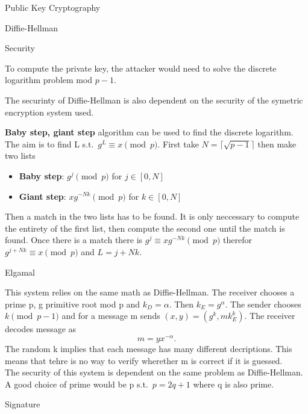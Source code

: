 \documentclass[12pt, letterpaper]{article}
\begin{document}
\begin{section}{Public Key Cryptography}
\begin{subsection}{Diffie-Hellman}
    \begin{subsubsection}{Security}

      To compute the private key, the attacker would need to solve the discrete
      logarithm problem mod \(p - 1\).

      The securinty of Diffie-Hellman is also dependent on the security of the
      symetric encryption system used.

      \textbf{Baby step, giant step}
      algorithm can be used to find the discrete logarithm. The aim is to find
      L s.t.\ \(g^{L} \equiv x \pmod{p}\).
      First take \(N = \lceil \sqrt{p - 1} \rceil\) then make two lists
      \begin{itemize}
        \item \textbf{Baby step}: \(g^{j} \pmod{p}\) for \(j \in [0, N]\)
        \item \textbf{Giant step}: \(xg^{-Nk} \pmod{p}\) for \(k \in [0, N]\)
      \end{itemize}
      Then a match in the two lists has to be found. It is only neccessary to
      compute the entirety of the first list, then compute the second one until
      the match is found. Once there is a match there is \(g^{j} \equiv
      xg^{-Nk} \pmod{p}\) therefor \(g^{j + Nk} \equiv x \pmod{p}\) and
      \(L = j + Nk\).

    \end{subsubsection}

  \end{subsection}

  \begin{subsection}{Elgamal}

    This system relies on the same math as Diffie-Hellman. The receiver chooses
    a prime p, g primitive root mod p and \(k_{D} = \alpha\). Then \(k_{E} =
    g^{\alpha}\). The sender chooses \(k \pmod{p - 1}\) and for a message m
    sends \((x, y) = (g^{k}, mk_{E}^{k})\). The receiver decodes message as
    \[m = yx^{-\alpha}.\] The random k implies that each message has many
    different decriptions. This means that tehre is no way to verify wherether
    m is correct if it is guessed. \\
    The security of this system is dependent on the same problem as
    Diffie-Hellman. \\
    A good choice of prime would be p s.t.\ \(p = 2q + 1\) where q is also
    prime.

    \begin{subsubsection}{Signature}


\end{subsubsection}
\end{subsection}
\end{section}
\end{document}
